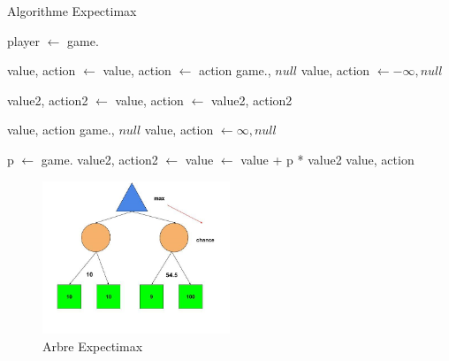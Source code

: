\begin{algorithm}[H]
    \caption{Algorithme Expectimax}\label{alg:expectimax}
    \begin{algorithmic}
        \State player $\leftarrow$ game.
        
            \State value, action $\leftarrow$  
        \Else 
            \State value, action $\leftarrow$ 
        \EndIf
        \State \Return action
        \EndFunction
        \vspace{0.5cm}
            \State \Return game., $null$
        \EndIf 
        \State value, action $\leftarrow -\infty, null$

            \State value2, action2 $\leftarrow$ 
                \State value, action $\leftarrow$ value2, action2
            \EndIf
        \EndFor

        \Return value, action
        \EndFunction
        \vspace{0.5cm}
            \State \Return game., $null$
        \EndIf 
        \State value, action $\leftarrow \infty, null$ 

        \State p $\leftarrow$ game.
        \State value2, action2 $\leftarrow$ %
        \State value $\leftarrow$ value + p * value2
        \EndFor
        \State \Return value, action
        \EndFunction
    \end{algorithmic} 
\end{algorithm}

\begin{figure}
    \begin{center}
        \includegraphics[width=0.5\textwidth]{../pictures/expectimaxdrawing.png}
    \end{center}
    \caption{Arbre Expectimax}\label{fig:expectimaxtree}
\end{figure}



